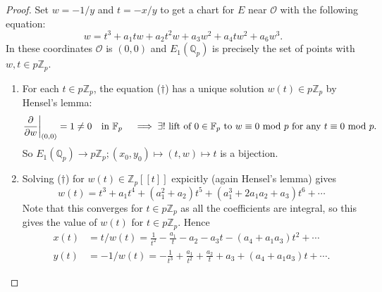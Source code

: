 \documentclass[a4paper]{article}
\theoremstyle{definition}
\newcommand{\series}[2]{#1[\![#2]\!]}
\renewcommand{\O}{\mathcal{O}}
\newcommand{\F}{\mathbb{F}}
\newcommand{\Z}{\mathbb{Z}}
\newcommand{\Q}{\mathbb{Q}}
\begin{document}
\begin{proof}
    Set $w=-1/y$ and $t=-x/y$ to get a chart for $E$ near $\O$ with the
    following equation:
    \begin{equation*}
        w = t^3 + a_1tw + a_2t^2w + a_3w^2 + a_4tw^2 + a_6w^3. \tag{$\dagger$}
    \end{equation*}
    In these coordinates $\O$ is $(0,0)$ and $E_1(\Q_p)$ is precisely the set of
    points with $w,t\in p\Z_p$.
    \begin{enumerate}[label=(\roman*)]
        \item For each $t\in p\Z_p$, the equation ($\dagger$) has a unique
            solution $w(t)\in p\Z_p$ by Hensel's lemma:
            \begin{equation*}
                \pdv{}{w}\biggr|_{(0,0)} = 1 \ne 0 \quad \text{in $\F_p$} \quad
                \implies \text{$\exists!$ lift of $0\in\F_p$ to $w\equiv0$ mod
                $p$ for any $t\equiv0$ mod $p$.}
            \end{equation*}
            So $E_1(\Q_p)\to p\Z_p;(x_0,y_0)\mapsto(t,w)\mapsto t$ is a
            bijection.

        \item Solving ($\dagger$) for $w(t)\in\series{\Z_p}{t}$ expicitly (again
            Hensel's lemma) gives
            \begin{equation*}
                w(t) = t^3 + a_1t^4 + (a_1^2 + a_2)t^5 + (a_1^3 + 2a_1a_2
                    + a_3)t^6 + \cdots
            \end{equation*}
            Note that this converges for $t\in p\Z_p$ as all the coefficients
            are integral, so this gives the value of $w(t)$ for $t\in p\Z_p$.
            Hence
            \begin{align*}
                x(t) &= t/w(t) = \frac{1}{t^2} - \frac{a_1}{t} - a_2 - a_3t
                    - (a_4+a_1a_3)t^2 + \cdots \\
                y(t) &= -1/w(t) = -\frac{1}{t^3} + \frac{a_1}{t^2}
                    + \frac{a_2}{t} + a_3 + (a_4+a_1a_3)t + \cdots.
            \end{align*}
    \end{enumerate}
\end{proof}
\end{document}

